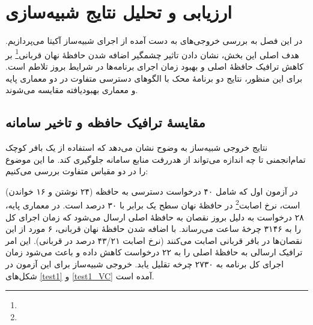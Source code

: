 %
%
%
%


\chapter{ارزیابی و تحلیل نتایج شبیه‌سازی}

در این فصل به بررسی خروجی‌های به دست آمده از اجرای شبیه‌ساز آکیتا می‌پردازیم. هدف اصلی این بخش، نشان دادن تاثیر چشمگیر اضافه شدن حافظهٔ نهان قربانی\footnote{} بر کاهش ترافیک حافظهٔ اصلی و بهبود زمان اجرای برنامه‌ها در شرایط بروز تلاطم است. برای این منظور، نتایج دو برنامهٔ محک با الگوهای دسترسی متفاوت در دو معماری پایه و معماری بهبودیافته مقایسه می‌شوند.

\section{مقایسهٔ ترافیک حافظه و تاخیر سامانه}

نتایج خروجی شبیه‌ساز به وضوح نشان می‌دهد که استفاده از یک بافر کوچک تمام‌انجمنی تا چه اندازه می‌تواند از هدررفت منابع سامانه جلوگیری کند. ما این موضوع را در دو مقیاس متفاوت بررسی می‌کنیم:

در آزمون اول که شامل ۴۰ درخواست دسترسی به حافظه (۲۴ نوشتن و ۱۶ خواندن) است، نرخ اصابت\footnote{} در حافظهٔ نهان سطح یک برابر با ۳۰ درصد است. در معماری پایه، ۲۸ درخواست به دلیل بروز نقصان به حافظهٔ اصلی ارسال می‌شود که زمان اجرای کل را به ۳۱۴۶ چرخهٔ ساعت می‌رساند. با اضافه شدن حافظهٔ نهان قربانی، ۶ مورد از این نقصان‌ها در بافر قربانی اصابت می‌کنند (نرخ اصابت ۴۳/۲۱ درصد در قربانی). این امر ترافیک ارسالی به حافظهٔ اصلی را به ۲۲ درخواست کاهش داده و باعث می‌شود زمان اجرای کل برنامه به ۲۷۳۰ چرخه تقلیل یابد. 
خروجی شبیه‌ساز برای این آزمون در شکل‌های \ref{test1} و \ref{test1_VC} آمده است.


